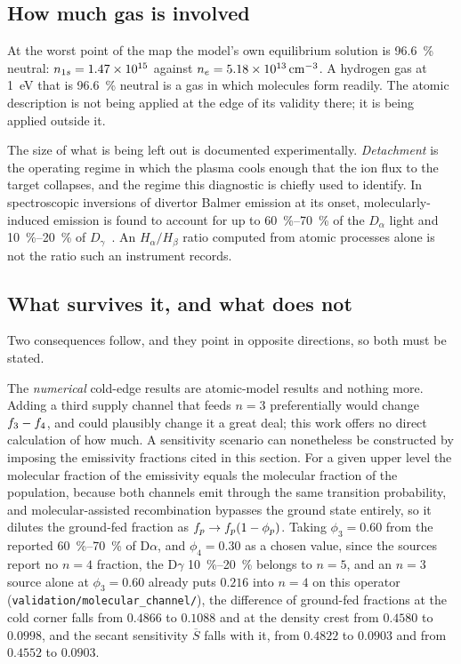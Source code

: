 \subsection{How much gas is involved}

At the worst point of the map the model's own equilibrium solution is
\SI{96.6}{\percent} neutral: $n_{1s} = 1.47\times10^{15}$ against
$n_e = 5.18\times10^{13}\,\si{\per\cubic\centi\metre}$. A hydrogen gas at
\SI{1}{\electronvolt} that is \SI{96.6}{\percent} neutral is a gas in which
molecules form readily. The atomic description is not being applied at the edge
of its validity there; it is being applied outside it.

The size of what is being left out is documented experimentally.
\emph{Detachment} is the operating regime in which the plasma cools enough that
the ion flux to the target collapses, and the regime this diagnostic is chiefly
used to identify. In spectroscopic inversions of divertor Balmer emission at its
onset, molecularly-induced emission is found to account for up to
\SIrange{60}{70}{\percent} of the $D_\alpha$ light and
\SIrange{10}{20}{\percent} of $D_\gamma$~\cite{Wijkamp2023,Verhaegh2021}. An
$H_\alpha/H_\beta$ ratio computed from atomic processes alone is not the ratio
such an instrument records.

\subsection{What survives it, and what does not}

Two consequences follow, and they point in opposite directions, so both must be
stated.

The \emph{numerical} cold-edge results are atomic-model results and nothing
more. Adding a third supply channel that feeds $n=3$ preferentially would change
$f_{3}-f_{4}$, and could plausibly change it a great deal; this work
offers no direct calculation of how much. A sensitivity scenario can
nonetheless be constructed by imposing the emissivity fractions cited in this
section. For a given
upper level the molecular fraction of the emissivity equals the molecular
fraction of the population, because both channels emit through the same
transition probability, and molecular-assisted recombination bypasses the ground
state entirely, so it dilutes the ground-fed fraction as
$f_{p} \to f_{p}(1-\phi_p)$. Taking $\phi_3 = 0.60$ from the reported
\SIrange{60}{70}{\percent} of $\mathrm{D}\alpha$, and $\phi_4 = 0.30$ as a
chosen value, since the sources report no $n=4$ fraction, the $\mathrm{D}\gamma$
\SIrange{10}{20}{\percent} belongs to $n=5$, and an $n=3$ source alone at
$\phi_3 = 0.60$ already puts $0.216$ into $n=4$ on this operator
(\texttt{validation/molecular\_channel/}), the difference of ground-fed
fractions at the cold corner falls from $0.4866$ to $0.1088$ and at the density
crest from $0.4580$ to $0.0998$, and the secant sensitivity $\overline{S}$
falls with it, from $0.4822$ to $0.0903$ and from $0.4552$ to $0.0903$.

